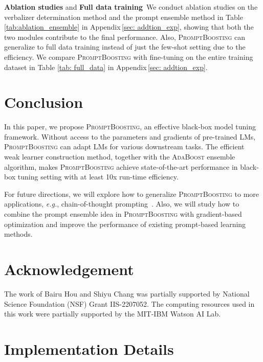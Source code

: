 \documentclass{article}
\theoremstyle{plain}
\theoremstyle{definition}
\theoremstyle{remark}
\newcommand{\alg}{\textsc{PromptBoosting}}
\begin{document}
\noindent \textbf{Ablation studies} and \textbf{Full data training}\ 
We conduct ablation studies on the verbalizer determination method and the prompt ensemble method in Table\,\ref{tab:ablation_ensemble} in Appendix\,\ref{sec: addtion_exp}, showing that both the two modules contribute to the final performance. Also, {\alg} can generalize to full data training instead of just the few-shot setting due to the efficiency. 
We compare {\alg} with fine-tuning on the entire training dataset in Table \ref{tab: full_data} in Appendix\,\ref{sec: addtion_exp}.

\section{Conclusion}
In this paper, we propose {\alg}, an effective black-box model tuning framework. Without access to the parameters and gradients of pre-trained LMs, {\alg} can adapt LMs for various downstream tasks. The efficient weak learner construction method, together with the \textsc{AdaBoost} ensemble algorithm, makes {\alg} achieve state-of-the-art performance in black-box tuning setting with at least 10x run-time efficiency. 

For future directions, we will explore how to generalize {\alg} to more applications, \emph{e.g.}, chain-of-thought prompting~\citep{wei2022chain}. Also, we will study how to combine the prompt ensemble idea in {\alg} with gradient-based optimization and improve the performance of existing prompt-based learning methods.

\section{Acknowledgement}
The work of Bairu Hou and Shiyu Chang was partially supported by National Science Foundation (NSF) Grant IIS-2207052. The computing resources used in this work were partially supported by the MIT-IBM Watson AI Lab.






\newpage
\appendix
\onecolumn
\section{Implementation Details}
\label{sec: implementation}
\end{document}
